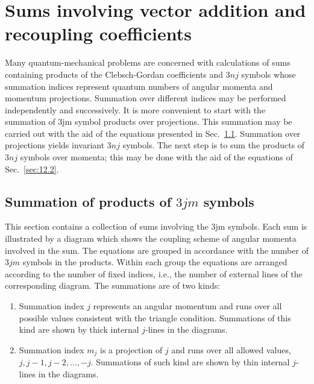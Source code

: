 \chapter{Sums involving vector addition and recoupling coefficients}\label{chap:12}
Many quantum-mechanical problems are concerned with calculations of sums containing products of the Clebsch-Gordan coefficients and \(3nj\) symbols whose summation indices represent quantum numbers of angular momenta and momentum projections. Summation over different indices may be performed independently and successively. It is more convenient to start with the summation of 3jm symbol products over projections. This summation may be carried out with the aid of the equations presented in Sec.~\ref{sec:12.1}. Summation over projections yields invariant \(3nj\) symbols. The next step is to sum the products of \(3nj\) symbols over momenta; this may be done with the aid of the equations of Sec.~\ref{sec:12.2}.

\section{Summation of products of $3 j m$ symbols}\label{sec:12.1}
This section contains a collection of sums involving the 3jm symbols. Each sum is illustrated by a diagram which shows the coupling scheme of angular momenta involved in the sum. The equations are grouped in accordance with the number of $3 j m$ symbols in the products. Within each group the equations are arranged according to the number of fixed indices, i.e., the number of external lines of the corresponding diagram. The summations are of two kinds:\\
\begin{enumerate}[label=(\alph*)]
\item Summation index $j$ represents an angular momentum and runs over all possible values consistent with the triangle condition. Summations of this kind are shown by thick internal $j$-lines in the diagrams.
\item Summation index $m_{j}$ is a projection of $j$ and runs over all allowed values, $j, j-1, j-2, \ldots,-j$. Summations of such kind are shown by thin internal $j$-lines in the diagrams.
\end{enumerate}

